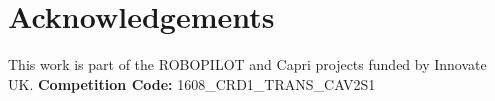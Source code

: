 

\section*{Acknowledgements}
\noindent This work is part of the ROBOPILOT and Capri projects funded by Innovate UK.
\textbf{Competition Code:} 1608\_CRD1\_TRANS\_CAV2S1


\printbibliography